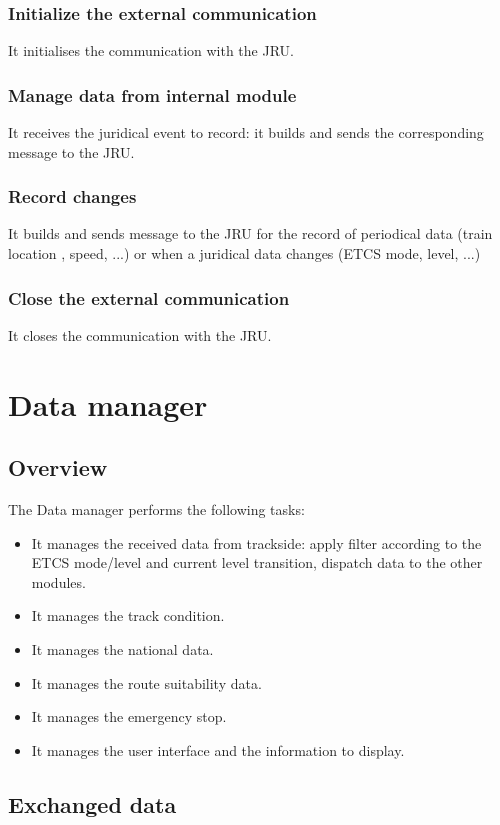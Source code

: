 \documentclass[nocc]{template/openetcs_report}
\begin{document}
\subsection{Initialize the external communication}
It initialises the communication with the JRU.
\subsection{Manage data from internal module}
It receives the juridical event to record: it builds and sends the corresponding message to the JRU.
\subsection{Record changes}
It builds and sends message to the JRU for the record of periodical data (train location , speed, ...) or when a juridical data changes (ETCS mode, level, ...)
\subsection{Close the external communication}
It closes the communication with the JRU.
\chapter{Data manager}
\section{Overview}
The Data manager performs the following tasks:
\begin{itemize}
\item	It manages the received data from trackside: apply filter according to the ETCS mode/level and current level transition, dispatch data to the other modules.
\item	It manages the track condition.
\item	It manages the national data.
\item	It manages the route suitability data.
\item	It manages the emergency stop.
\item	It manages the user interface and the information to display.
\end{itemize}

\section{Exchanged data}
\end{document}
